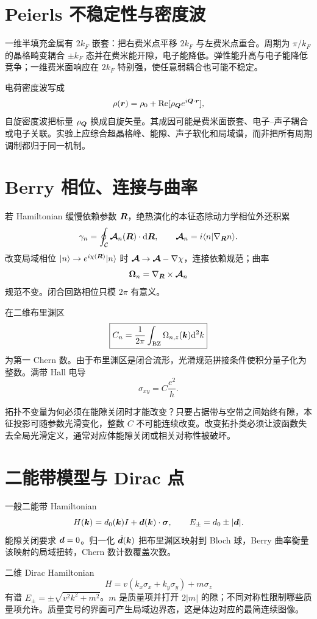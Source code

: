 \section{Peierls 不稳定性与密度波}
一维半填充金属有 $2k_F$ 嵌套：把右费米点平移 $2k_F$ 与左费米点重合。周期为 $\pi/k_F$ 的晶格畸变耦合 $\pm k_F$ 态并在费米能开隙，电子能降低。弹性能升高与电子能降低竞争；一维费米面响应在 $2k_F$ 特别强，使任意弱耦合也可能不稳定。

电荷密度波写成
\[
\rho(\bm{r})=\rho_0+\mathrm{Re}[
\rho_{\bm{Q}}e^{i\bm{Q}\cdot\bm{r}}],
\]
自旋密度波把标量 $\rho_{\bm{Q}}$ 换成自旋矢量。其成因可能是费米面嵌套、电子--声子耦合或电子关联。实验上应综合超晶格峰、能隙、声子软化和局域谱，而非把所有周期调制都归于同一机制。

\section{Berry 相位、连接与曲率}
若 Hamiltonian 缓慢依赖参数 $\bm{R}$，绝热演化的本征态除动力学相位外还积累
\[
\gamma_n=\oint_{\mathcal C}
\bm{\mathcal A}_n(\bm{R})\cdot\mathrm d\bm{R},\qquad
\bm{\mathcal A}_n=i\langle n|\nabla_{\bm{R}}n\rangle.
\]
改变局域相位
$|n\rangle\to e^{i\chi(\bm{R})}|n\rangle$ 时
$\bm{\mathcal A}\to\bm{\mathcal A}-\nabla\chi$，连接依赖规范；曲率
\[
\bm{\Omega}_n=\nabla_{\bm{R}}\times\bm{\mathcal A}_n
\]
规范不变。闭合回路相位只模 $2\pi$ 有意义。

在二维布里渊区
\[
\boxed{C_n=\frac1{2\pi}\int_{\rm BZ}\Omega_{n,z}(\bm{k})\mathrm d^2k}
\]
为第一 Chern 数。由于布里渊区是闭合流形，光滑规范拼接条件使积分量子化为整数。满带 Hall 电导
\[
\sigma_{xy}=C\frac{e^2}{h}.
\]

\begin{whybox}
拓扑不变量为何必须在能隙关闭时才能改变？只要占据带与空带之间始终有隙，本征投影可随参数光滑变化，整数 $C$ 不可能连续改变。改变拓扑类必须让波函数失去全局光滑定义，通常对应体能隙关闭或相关对称性被破坏。
\end{whybox}

\section{二能带模型与 Dirac 点}
一般二能带 Hamiltonian
\[
H(\bm{k})=d_0(\bm{k})I+\bm{d}(\bm{k})\cdot\bm{\sigma},
\qquad E_\pm=d_0\pm|\bm{d}|.
\]
能隙关闭要求 $\bm{d}=0$。归一化
$\hat{\bm{d}}(\bm{k})$ 把布里渊区映射到 Bloch 球，Berry 曲率衡量该映射的局域扭转，Chern 数计数覆盖次数。

二维 Dirac Hamiltonian
\[
H=v(k_x\sigma_x+k_y\sigma_y)+m\sigma_z
\]
有谱
$E_\pm=\pm\sqrt{v^2k^2+m^2}$。$m$ 是质量项并打开 $2|m|$ 的隙；不同对称性限制哪些质量项允许。质量变号的界面可产生局域边界态，这是体边对应的最简连续图像。

